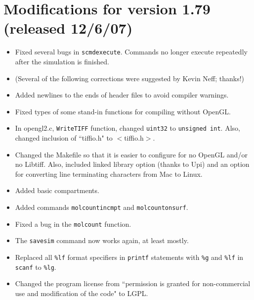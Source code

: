 \documentclass {scrbook}
\newcommand {\ttt} {\texttt}
\begin{document}
\section{Modifications for version 1.79 (released 12/6/07)}
\begin{itemize}
\item Fixed several bugs in \ttt{scmdexecute}. Commands no longer execute repeatedly after the simulation is finished.
\item (Several of the following corrections were suggested by Kevin Neff; thanks!)
\item Added newlines to the ends of header files to avoid compiler warnings.
\item Fixed types of some stand-in functions for compiling without OpenGL.
\item In opengl2.c, \ttt{WriteTIFF} function, changed \ttt{uint32} to \ttt{unsigned int}. Also, changed inclusion of ``tiffio.h" to $<$tiffio.h$>$.
\item Changed the Makefile so that it is easier to configure for no OpenGL and/or no Libtiff. Also, included linked library option (thanks to Upi) and an option for converting line terminating characters from Mac to Linux.
\item Added basic compartments.
\item Added commands \ttt{molcountincmpt} and \ttt{molcountonsurf}.
\item Fixed a bug in the \ttt{molcount} function.
\item The \ttt{savesim} command now works again, at least mostly.
\item Replaced all \ttt{\%lf} format specifiers in \ttt{printf} statements with \ttt{\%g} and \ttt{\%lf} in \ttt{scanf} to \ttt{\%lg}.
\item Changed the program license from ``permission is granted for non-commercial use and modification of the code" to LGPL.
\end{itemize}
\end{document}
